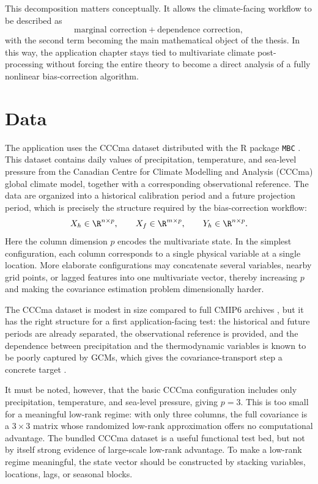 This decomposition matters conceptually. It allows the climate-facing workflow to
be described as
\[
	\text{marginal correction} + \text{dependence correction},
\]
with the second term becoming the main mathematical object of the thesis. In this
way, the application chapter stays tied to multivariate climate post-processing
without forcing the entire theory to become a direct analysis of a fully nonlinear
bias-correction algorithm.

\section{Data}

The application uses the CCCma dataset distributed with the R package
\texttt{MBC} \cite{cannon2020mbcpackage}. This dataset contains daily values of
precipitation, temperature, and sea-level pressure from the Canadian Centre for
Climate Modelling and Analysis (CCCma) global climate model, together with a
corresponding observational reference. The data are organized into a historical
calibration period and a future projection period, which is precisely the structure
required by the bias-correction workflow:
\[
	X_h \in \R^{n \times p}, \qquad X_f \in \R^{m \times p}, \qquad Y_h \in \R^{n \times p}.
\]
Here the column dimension \(p\) encodes the multivariate state. In the simplest
configuration, each column corresponds to a single physical variable at a single
location. More elaborate configurations may concatenate several variables, nearby
grid points, or lagged features into one multivariate vector, thereby increasing \(p\)
and making the covariance estimation problem dimensionally harder.

The CCCma dataset is modest in size compared to full CMIP6 archives
\cite{eyring2016cmip6}, but it has the right structure for a first
application-facing test: the historical and future periods are already separated,
the observational reference is provided, and the dependence between
precipitation and the thermodynamic variables is known to be poorly captured by
GCMs, which gives the covariance-transport step a concrete target
\cite{francois2020multivariate}.

It must be noted, however, that the basic CCCma configuration includes only
precipitation, temperature, and sea-level pressure, giving \(p = 3\). This is too
small for a meaningful low-rank regime: with only three columns, the full
covariance is a \(3 \times 3\) matrix whose randomized low-rank approximation
offers no computational advantage. The bundled CCCma dataset is a useful
functional test bed, but not by itself strong evidence of large-scale low-rank
advantage. To make a low-rank regime meaningful, the state vector should be
constructed by stacking variables, locations, lags, or seasonal blocks.

